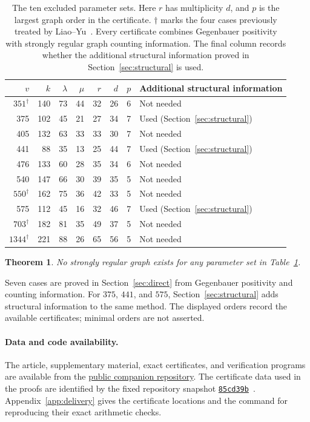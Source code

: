 \documentclass[11pt]{article}
\newtheorem{theorem}{Theorem}[section]
\theoremstyle{remark}
\numberwithin{equation}{section}
\begin{document}
\begin{table}[htbp]
\centering\small
\caption{The ten excluded parameter sets. Here $r$ has multiplicity $d$,
and $p$ is the largest graph order in the certificate.
$\dagger$ marks the four cases previously treated by Liao--Yu~\cite{LY}.
Every certificate combines Gegenbauer positivity with strongly regular
graph counting information. The final column records whether the
additional structural information proved in Section~\ref{sec:structural}
is used.}
\label{tab:parameters}
\begin{tabular}{@{}rrrrrrcl@{}}
\toprule
$v$&$k$&$\lambda$&$\mu$&$r$&$d$&$p$&Additional structural information\\
\midrule
$351^\dagger$&140&73&44&32&26&6&Not needed\\
375&102&45&21&27&34&7&Used (Section~\ref{sec:structural})\\
405&132&63&33&33&30&7&Not needed\\
441&88&35&13&25&44&7&Used (Section~\ref{sec:structural})\\
476&133&60&28&35&34&6&Not needed\\
540&147&66&30&39&35&5&Not needed\\
$550^\dagger$&162&75&36&42&33&5&Not needed\\
575&112&45&16&32&46&7&Used (Section~\ref{sec:structural})\\
$703^\dagger$&182&81&35&49&37&5&Not needed\\
$1344^\dagger$&221&88&26&65&56&5&Not needed\\
\bottomrule
\end{tabular}
\end{table}

\begin{theorem}\label{thm:main}
No strongly regular graph exists for any parameter set in
Table~\ref{tab:parameters}.
\end{theorem}
Seven cases are proved in Section~\ref{sec:direct} from Gegenbauer
positivity and counting information. For $375$, $441$, and $575$,
Section~\ref{sec:structural} adds structural information to the same
method. The displayed orders record the available certificates;
minimal orders are not asserted.

\paragraph{Data and code availability.}
The article, supplementary material, exact certificates, and verification
programs are available from the
\href{https://github.com/SelenaJXWANG/srg-gegenbauer-counting}{public companion repository}.
The certificate data used in the proofs are identified by the fixed
repository snapshot \href{https://github.com/SelenaJXWANG/srg-gegenbauer-counting/tree/85cd39b74c9ef8a61ab746deb1102af3eeae7e10}{\texttt{85cd39b}}~\cite{certificateData}.
Appendix~\ref{app:delivery} gives the certificate locations and the
command for reproducing their exact arithmetic checks.
\end{document}
